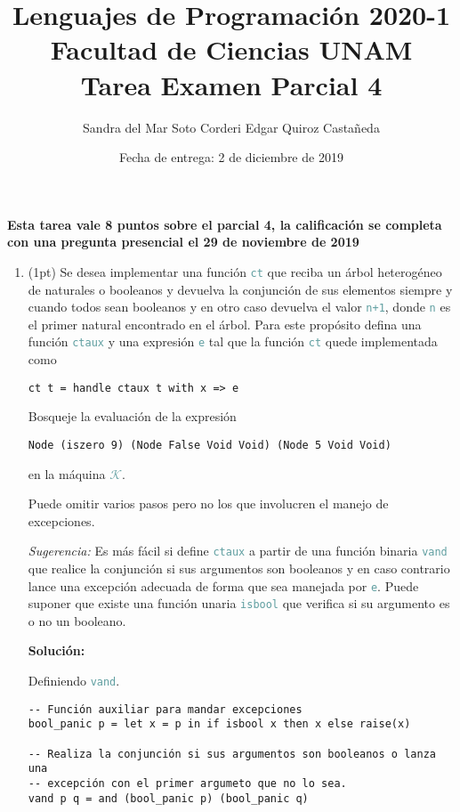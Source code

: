\documentclass{article}
\title {
    \color{RoyalPurple}
    Lenguajes de Programación 2020-1\\
    Facultad de Ciencias UNAM\\
    Tarea Examen Parcial 4
}
\author{
    Sandra del Mar Soto Corderi \quad Edgar Quiroz Castañeda
}
\date{
    Fecha de entrega: 2 de diciembre de 2019
}
\newcommand{\tp}[1]{\textcolor{CadetBlue} {\texttt{#1}}}
\newcommand{\tb}[1]{\textcolor{RoyalPurple} {\textbf{#1}}}
\newcommand{\ti}[1]{\textcolor{RoyalPurple} {\textit{#1}}}
\newcommand{\pt}[1]{\textcolor{RoyalPurple}{(#1pt)}}
\begin{document}
    \maketitle

    \tb{Esta tarea vale 8 puntos sobre el parcial 4, la calificación se
    completa con una pregunta presencial el 29 de noviembre de 2019}

    \begin{enumerate}
        \item \pt{1} Se desea implementar una función \tp{ct} que reciba un
        árbol heterogéneo de naturales o booleanos y devuelva la conjunción de
        sus elementos siempre y cuando todos sean booleanos y en otro caso
        devuelva el valor \tp{n+1}, donde \tp{n} es el primer natural encontrado en el
        árbol. Para este propósito defina una función \tp{ctaux} y una expresión
        \tp{e} tal que la función \tp{ct} quede implementada como

        \begin{verbatim}
ct t = handle ctaux t with x => e
        \end{verbatim}

        Bosqueje la evaluación de la expresión

        \begin{verbatim}
Node (iszero 9) (Node False Void Void) (Node 5 Void Void)
        \end{verbatim}

        en la máquina \tp{$\mathcal{K}$}.

        Puede omitir varios pasos pero no los que involucren el manejo de excepciones.

        \ti{Sugerencia:} Es más fácil si define \tp{ctaux} a partir de una
        función binaria \tp{vand} que realice la conjunción si sus argumentos
        son booleanos y en caso contrario lance una excepción adecuada de forma
        que sea manejada por \tp{e}. Puede suponer que existe una función unaria
        \tp{isbool} que verifica si su argumento es o no un booleano.

        \tb{Solución:}

        Definiendo \tp{vand}.

        \begin{verbatim}
-- Función auxiliar para mandar excepciones
bool_panic p = let x = p in if isbool x then x else raise(x)

-- Realiza la conjunción si sus argumentos son booleanos o lanza una
-- excepción con el primer argumeto que no lo sea.
vand p q = and (bool_panic p) (bool_panic q)
        \end{verbatim}


\end{enumerate}
\end{document}
